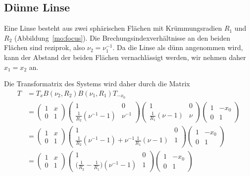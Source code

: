 %
%
%
\subsection{Dünne Linse\label{mo:subsection:linse}}
Eine Linse besteht aus zwei sphärischen Flächen mit 
Krümmungsradien $R_1$ und $R_2$ (Abbildung~\ref{mo:focus}).
Die Brechungsindexverhältnisse an den beiden Flächen sind reziprok,
also $\nu_2=\nu_1^{-1}$.
Da die Linse als dünn angenommen wird, kann der Abstand der beiden Flächen
vernachlässigt werden, wir nehmen daher $x_1=x_2$ an.

Die Transformatrix des Systems wird daher durch die Matrix
\begin{align*}
T
&=
T_x
B(\nu_2, R_2)
B(\nu_1, R_1)
T_{-x_0}
\\
&=
\begin{pmatrix}
1&x\\
0&1
\end{pmatrix}
\begin{pmatrix}
1&0\\
\frac1{R_2}(\nu^{-1}-1)&\nu^{-1}
\end{pmatrix}
\begin{pmatrix}
1&0\\
\frac1{R_1}(\nu-1)&\nu
\end{pmatrix}
\begin{pmatrix}
1&-x_0\\
0&1
\end{pmatrix}
\\
&=
\begin{pmatrix}
1&x\\
0&1
\end{pmatrix}
\begin{pmatrix}
1&0\\
\frac1{R_2}(\nu^{-1}-1)+\nu^{-1}\frac{1}{R_1}(\nu-1)&1
\end{pmatrix}
\begin{pmatrix}
1&-x_0\\
0&1
\end{pmatrix}
\\
&=
\begin{pmatrix}
1&x\\
0&1
\end{pmatrix}
\begin{pmatrix}
1&0\\
\displaystyle
\biggl(\frac1{R_2}-\frac1{R_1}\biggr)(\nu^{-1}-1)
&1
\end{pmatrix}
\begin{pmatrix}
1&-x_0\\
0&1
\end{pmatrix}
\end{align*}
